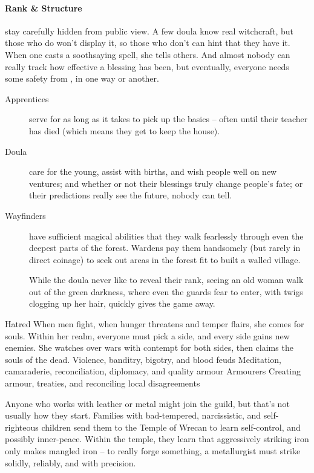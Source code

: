 \begin{multicols}{2}
  \paragraph{Rank \& Structure}
  stay carefully hidden from public view.
  A few doula know real witchcraft, but those who do won't display it, so those who don't can hint that they have it.
  When one casts a soothsaying spell, she tells others.
  And almost nobody can really track how effective a blessing has been, but eventually, everyone needs some safety from \hphantom{Nemo}, in one way or another.

  \begin{description}
    \item[Apprentices]
    serve for as long as it takes to pick up the basics -- often until their teacher has died (which means they get to keep the house).
    \item[Doula]
    care for the young, assist with births, and wish people well on new ventures; and whether or not their blessings truly change people's fate; or their predictions really see the future, nobody can tell.
    \item[Wayfinders]
    have sufficient magical abilities that they walk fearlessly through even the deepest parts of the forest.
    Wardens pay them handsomely (but rarely in direct coinage) to seek out areas in the forest fit to built a walled village.

    While the doula never like to reveal their rank, seeing an old woman walk out of the green darkness, where even the \glspl{guard} fear to enter, with twigs clogging up her hair, quickly gives the game away.
  \end{description}

  {Hatred}%
  {When men fight, when hunger threatens and temper flairs, she comes for souls.
  Within her realm, everyone must pick a side, and every side gains new enemies.
  She watches over wars with contempt for both sides, then claims the souls of the dead.}%
  {Violence, banditry, bigotry, and blood feuds}%
  {Meditation, camaraderie, reconciliation, diplomacy, and quality armour}%
  {Armourers}%
  {Creating armour, treaties, and reconciling local disagreements}%

Anyone who works with leather or metal might join the guild, but that's not usually how they start.
Families with bad-tempered, narcissistic, and self-righteous children send them to the Temple of Wrecan to learn self-control, and possibly inner-peace.
Within the temple, they learn that aggressively striking iron only makes mangled iron -- to really forge something, a metallurgist must strike solidly, reliably, and with precision.


\end{multicols}
